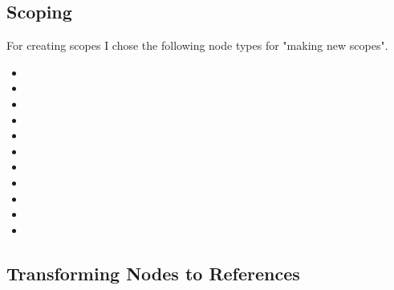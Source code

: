 \subsection{Scoping}\label{subsec:inst-scoping}

For creating scopes I chose the following node types for "making new scopes".

\begin{itemize}
    \item {}
    \item {}
    \item {}
    \item {}
    \item {}
    \item {}
    \item {}
    \item {}
    \item {}
    \item {}
    \item {}
\end{itemize}

\subsection{Transforming Nodes to References}\label{subsec:transforming-nodes-to-references}
